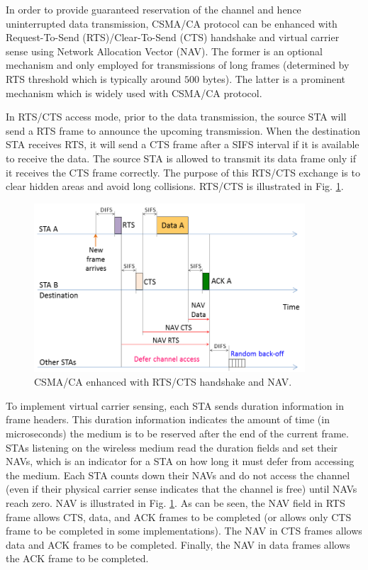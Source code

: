 In order to provide guaranteed reservation of the channel and hence uninterrupted data transmission, CSMA/CA protocol can be enhanced with Request-To-Send (RTS)/Clear-To-Send (CTS) handshake and virtual carrier sense using Network Allocation Vector (NAV). The former is an optional mechanism and only employed for transmissions of long frames (determined by RTS threshold which is typically around $500$ bytes). The latter is a prominent mechanism which is widely used with CSMA/CA protocol.

In RTS/CTS access mode, prior to the data transmission, the source STA will send a RTS frame to announce the upcoming transmission. When the destination STA receives RTS, it will send a CTS frame after a SIFS interval if it is available to receive the data. The source STA is allowed to transmit its data frame only if it receives the CTS frame correctly. The purpose of this RTS/CTS exchange is to clear hidden areas and avoid long collisions. RTS/CTS is illustrated in Fig. \ref{figs:802-11-RTS-CTS-NAV}.
\begin{figure}[!ht]
	\centering
	\includegraphics[width=0.9\textwidth]{figs/802-11-RTS-CTS-NAV}
	\caption{CSMA/CA enhanced with RTS/CTS handshake and NAV.}
	\label{figs:802-11-RTS-CTS-NAV}
\end{figure}

To implement virtual carrier sensing, each STA sends duration information in frame headers. This duration information indicates the amount of time (in microseconds) the medium is to be reserved after the end of the current frame. STAs listening on the wireless medium read the duration fields and set their NAVs, which is an indicator for a STA on how long it must defer from accessing the medium. Each STA counts down their NAVs and do not access the channel (even if their physical carrier sense indicates that the channel is free) until NAVs reach zero. NAV is illustrated in Fig. \ref{figs:802-11-RTS-CTS-NAV}. As can be seen, the NAV field in RTS frame allows CTS, data, and ACK frames to be completed (or allows only CTS frame to be completed in some implementations). The NAV in CTS frames allows data and ACK frames to be completed. Finally, the NAV in data frames allows the ACK frame to be completed.


